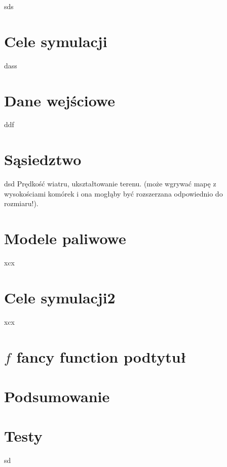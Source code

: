 \documentclass[a4paper, 11pt]{article}
\begin{document}
sds
	\section*{Cele symulacji}
	\indent
dass

	\section*{Dane wejściowe}
	\indent
	ddf
	\section*{Sąsiedztwo}
	\indent	
	
	dsd
	Prędkość wiatru, ukształtowanie terenu. (może wgrywać mapę z wysokościami komórek
	i ona mogłąby być rozszerzana odpowiednio do rozmiaru!).
	\section*{Modele paliwowe}
	\indent	
	
xcx
	\section*{Cele symulacji2}
	\indent
	
	xcx
	\section*{$ f $ fancy function podtytuł}
	\indent
	\begin{figure}[H]%
	\end{figure}
	\section*{Podsumowanie}
	\indent
	

	\begin{figure}[bt]
	\end{figure}
	\section{Testy}
	\indent
	sd
\end{document}

